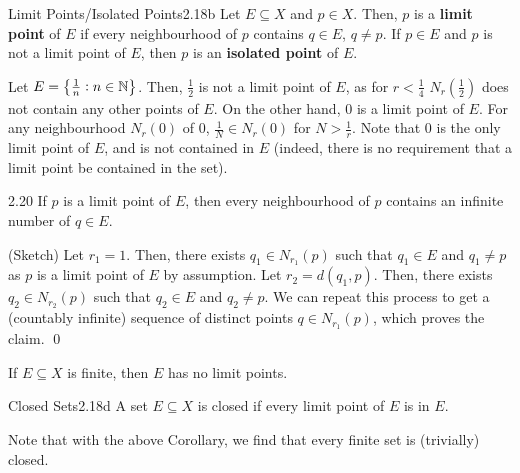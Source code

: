 \setcounter{rudin}{17}
\begin{definition}{Limit Points/Isolated Points}{2.18b}
    Let $E \subseteq X$ and $p \in X$. Then, $p$ is a \textbf{limit point} of $E$ if every neighbourhood of $p$ contains $q \in E$, $q \neq p$. If $p \in E$ and $p$ is not a limit point of $E$, then $p$ is an \textbf{isolated point} of $E$. 
\end{definition}
\begin{nexample}{}{}
    Let $E = \set{\frac{1}{n}: n \in \mathbb{N}}$. Then, $\frac{1}{2}$ is not a limit point of $E$, as for $r < \frac{1}{4}$ $N_r(\frac{1}{2})$ does not contain any other points of $E$. On the other hand, $0$ is a limit point of $E$. For any neighbourhood $N_r(0)$ of $0$, $\frac{1}{N} \in N_r(0)$ for $N > \frac{1}{r}$. Note that $0$ is the only limit point of $E$, and is not contained in $E$ (indeed, there is no requirement that a limit point be contained in the set). 
\end{nexample}

\setcounter{rudin}{19}

\begin{theorem}{}{2.20}
    If $p$ is a limit point of $E$, then every neighbourhood of $p$ contains an infinite number of $q \in E$. 
\end{theorem}

\begin{nproof}
    (Sketch) Let $r_1 = 1$. Then, there exists $q_1 \in N_{r_1}(p)$ such that $q_1 \in E$ and $q_1 \neq p$ as $p$ is a limit point of $E$ by assumption. Let $r_2 = d(q_1, p)$. Then, there exists $q_2 \in N_{r_2}(p)$ such that $q_2 \in E$ and $q_2 \neq p$. We can repeat this process to get a (countably infinite) sequence of distinct points $q \in N_{r_1}(p)$, which proves the claim. \qed 
\end{nproof}

\begin{ncorollary}{}{}
    If $E \subseteq X$ is finite, then $E$ has no limit points.
\end{ncorollary}

\setcounter{rudin}{17}
\begin{definition}{Closed Sets}{2.18d}
    A set $E \subseteq X$ is closed if every limit point of $E$ is in $E$. 
\end{definition}
\noindent Note that with the above Corollary, we find that every finite set is (trivially) closed.

